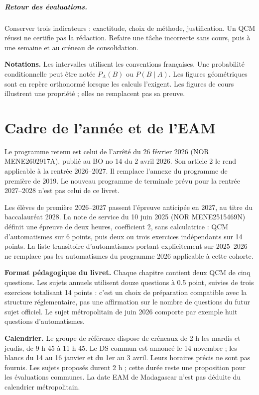 \ifmxteacher\paragraph{Retour des évaluations.} Conserver trois indicateurs : exactitude, choix de méthode, justification. Un QCM réussi ne certifie pas la rédaction. Refaire une tâche incorrecte sans cours, puis à une semaine et au créneau de consolidation.\fi

\textbf{Notations.} Les intervalles utilisent les conventions françaises. Une probabilité conditionnelle peut être notée $P_A(B)$ ou $P(B\mid A)$. Les figures géométriques sont en repère orthonormé lorsque les calculs l’exigent. Les figures de cours illustrent une propriété ; elles ne remplacent pas sa preuve.

\chapter*{Cadre de l’année et de l’EAM}
Le programme retenu est celui de l’arrêté du 26 février 2026 (NOR MENE2602917A), publié au BO no 14 du 2 avril 2026. Son article 2 le rend applicable à la rentrée 2026--2027. Il remplace l’annexe du programme de première de 2019. Le nouveau programme de terminale prévu pour la rentrée 2027--2028 n’est pas celui de ce livret.

Les élèves de première 2026--2027 passent l’épreuve anticipée en 2027, au titre du baccalauréat 2028. La note de service du 10 juin 2025 (NOR MENE2515469N) définit une épreuve de deux heures, coefficient 2, sans calculatrice : QCM d’automatismes sur 6 points, puis deux ou trois exercices indépendants sur 14 points. La liste transitoire d’automatismes portant explicitement sur 2025--2026 ne remplace pas les automatismes du programme 2026 applicable à cette cohorte.

\textbf{Format pédagogique du livret.} Chaque chapitre contient deux QCM de cinq questions. Les sujets annuels utilisent douze questions à \num{0,5} point, suivies de trois exercices totalisant 14 points : c’est un choix de préparation compatible avec la structure réglementaire, pas une affirmation sur le nombre de questions du futur sujet officiel. Le sujet métropolitain de juin 2026 comporte par exemple huit questions d’automatismes.

\textbf{Calendrier.} Le groupe de référence dispose de créneaux de 2 h les mardis et jeudis, de 9 h 45 à 11 h 45. Le DS commun est annoncé le 14 novembre ; les blancs du 14 au 16 janvier et du 1er au 3 avril. Leurs horaires précis ne sont pas fournis. Les sujets proposés durent 2 h ; cette durée reste une proposition pour les évaluations communes. La date EAM de Madagascar n’est pas déduite du calendrier métropolitain.

